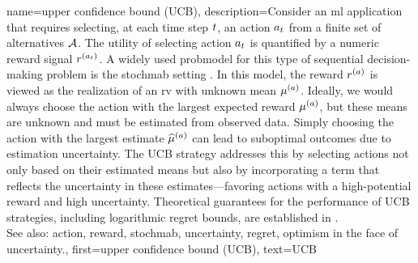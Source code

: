 {name={upper confidence bound (UCB)},
	description={Consider an \gls{ml} 
		application that requires selecting, at each time step $t$, an \gls{action} $a_{t}$ 
		from a finite set of alternatives $\mathcal{A}$. The utility of selecting \gls{action} $a_{t}$ 
		is quantified by a numeric \gls{reward} signal $r^{(a_{t})}$. 
		A widely used \gls{probmodel} for this type of sequential decision-making problem 
		is the \gls{stochmab} setting \cite{Bubeck2012}. In this \gls{model}, 
		the \gls{reward} $r^{(a)}$ is viewed as the \gls{realization} of an \gls{rv} 
		with unknown \gls{mean} $\mu^{(a)}$. Ideally, we would always choose the 
		\gls{action} with the largest expected \gls{reward} $\mu^{(a)}$, but these 
		\glspl{mean} are unknown and must be estimated from observed \gls{data}. Simply 
		choosing the \gls{action} with the largest estimate $\widehat{\mu}^{(a)}$ can 
		lead to suboptimal \glspl{outcome} due to estimation \gls{uncertainty}. The UCB strategy 
		addresses this by selecting \glspl{action} not only based on their estimated \glspl{mean} but 
		also by incorporating a term that reflects the \gls{uncertainty} in these estimates—favoring 
		\glspl{action} with a high-potential \gls{reward} and high \gls{uncertainty}. Theoretical guarantees 
		for the performance of UCB strategies, including logarithmic \gls{regret} bounds, are established in \cite{Bubeck2012}.
					\\ 
		See also: \gls{action}, \gls{reward}, \gls{stochmab}, \gls{uncertainty}, \gls{regret}, \gls{optimism in the face of uncertainty}.},
	first={upper confidence bound (UCB)},
	text={UCB} 
}

